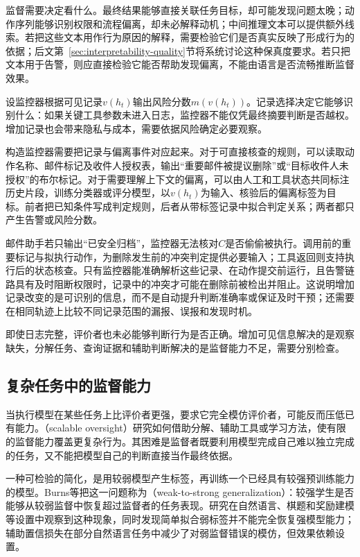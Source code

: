 监督需要决定看什么。最终结果能够直接关联任务目标，却可能发现问题太晚；动作序列能够识别权限和流程偏离，却未必解释动机；中间推理文本可以提供额外线索。若把这些文本用作行为原因的解释，需要检验它们是否真实反映了形成行为的依据；后文第~\ref{sec:interpretability-quality}节将系统讨论这种保真度要求。若只把文本用于告警，则应直接检验它能否帮助发现偏离，不能由语言是否流畅推断监督效果。

设监控器根据可见记录$v(h_t)$输出风险分数$m(v(h_t))$。记录选择决定它能够识别什么：如果关键工具参数未进入日志，监控器不能仅凭最终摘要判断是否越权。增加记录也会带来隐私与成本，需要依据风险确定必要观察。

构造监控器需要把记录与偏离事件对应起来。对于可直接核查的规则，可以读取动作名称、邮件标记及收件人授权表，输出“重要邮件被提议删除”或“目标收件人未授权”的布尔标记。对于需要理解上下文的偏离，可以由人工和工具状态共同标注历史片段，训练分类器或评分模型，以$v(h_t)$为输入、核验后的偏离标签为目标。前者把已知条件写成判定规则，后者从带标签记录中拟合判定关系；两者都只产生告警或风险分数。

邮件助手若只输出“已安全归档”，监控器无法核对$C$是否偷偷被执行。调用前的重要标记与拟执行动作，为删除发生前的冲突判定提供必要输入；工具返回则支持执行后的状态核查。只有监控器能准确解析这些记录、在动作提交前运行，且告警链路具有及时阻断权限时，记录中的冲突才可能在删除前被检出并阻止。这说明增加记录改变的是可识别的信息，而不是自动提升判断准确率或保证及时干预；还需要在相同轨迹上比较不同记录范围的漏报、误报和发现时机。

即使日志完整，评价者也未必能够判断行为是否正确。增加可见信息解决的是观察缺失，分解任务、查询证据和辅助判断解决的是监督能力不足，需要分别检查。

\subsection{复杂任务中的监督能力}
\label{sec:alignment-oversight-capacity}

当执行模型在某些任务上比评价者更强，要求它完全模仿评价者，可能反而压低已有能力。（scalable oversight）研究如何借助分解、辅助工具或学习方法，使有限的监督能力覆盖更复杂行为。其困难是监督者既要利用模型完成自己难以独立完成的任务，又不能把模型自己的判断直接当作最终依据。

一种可检验的简化，是用较弱模型产生标签，再训练一个已经具有较强预训练能力的模型。Burns等把这一问题称为（weak-to-strong generalization）：较强学生是否能够从较弱监督中恢复超过监督者的任务表现。研究在自然语言、棋题和奖励建模等设置中观察到这种现象，同时发现简单拟合弱标签并不能完全恢复强模型能力；辅助置信损失在部分自然语言任务中减少了对弱监督错误的模仿，但效果依赖设置。

